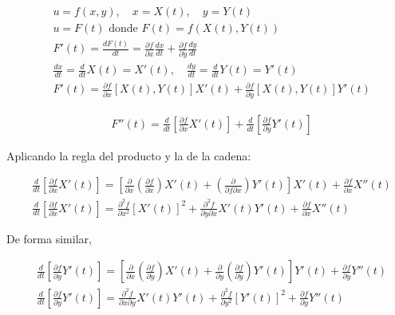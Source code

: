 \documentclass{report}
\begin{document}
    \begin{align*}
    & u = f(x, y), \quad x = X(t), \quad y = Y(t) \\
    & u = F(t) \text{ donde } F(t) = f(X(t), Y(t)) \\
    & F'(t) = \frac{d F(t)}{d t} = \frac{\partial f}{\partial x} \frac{d x}{d t} + \frac{\partial f}{\partial y} \frac{d y}{d t} \\
    & \frac{d x}{d t} = \frac{d}{d t} X(t) = X'(t), \quad \frac{d y}{d t} = \frac{d}{d t} Y(t) = Y'(t) \\
    & F'(t) = \frac{\partial f}{\partial x}[X(t), Y(t)] X'(t) + \frac{\partial f}{\partial y}[X(t), Y(t)] Y'(t)
    \end{align*}

    \begin{align*}
    & F''(t) = \frac{d}{d t} \left[ \frac{\partial f}{\partial x} X'(t) \right] + \frac{d}{d t} \left[ \frac{\partial f}{\partial y} Y'(t) \right]
    \end{align*}

    Aplicando la regla del producto y la de la cadena:

    \begin{align*}
    & \frac{d}{d t} \left[ \frac{\partial f}{\partial x} X'(t) \right] = \left[ \frac{\partial}{\partial x} \left( \frac{\partial f}{\partial x} \right) X'(t) + \left(\frac{\partial}{\partial f{\partial x}} \right) Y'(t) \right] X'(t) + \frac{\partial f}{\partial x} X''(t) \\
    & \frac{d}{d t} \left[ \frac{\partial f}{\partial x} X'(t) \right] = \frac{\partial^2 f}{\partial x^2} \left[ X'(t) \right]^2 + \frac{\partial^2 f}{\partial y \partial x} X'(t) Y'(t) + \frac{\partial f}{\partial x} X''(t)
    \end{align*}

    De forma similar,

    \begin{align*}
    & \frac{d}{d t} \left[ \frac{\partial f}{\partial y} Y'(t) \right] = \left[ \frac{\partial}{\partial x} \left( \frac{\partial f}{\partial y} \right) X'(t) + \frac{\partial}{\partial y} \left( \frac{\partial f}{\partial y} \right) Y'(t) \right] Y'(t) + \frac{\partial f}{\partial y} Y''(t) \\
    & \frac{d}{d t} \left[ \frac{\partial f}{\partial y} Y'(t) \right] = \frac{\partial^2 f}{\partial x \partial y} X'(t) Y'(t) + \frac{\partial^2 f}{\partial y^2} \left[ Y'(t) \right]^2 + \frac{\partial f}{\partial y} Y''(t)
    \end{align*}
\end{document}
